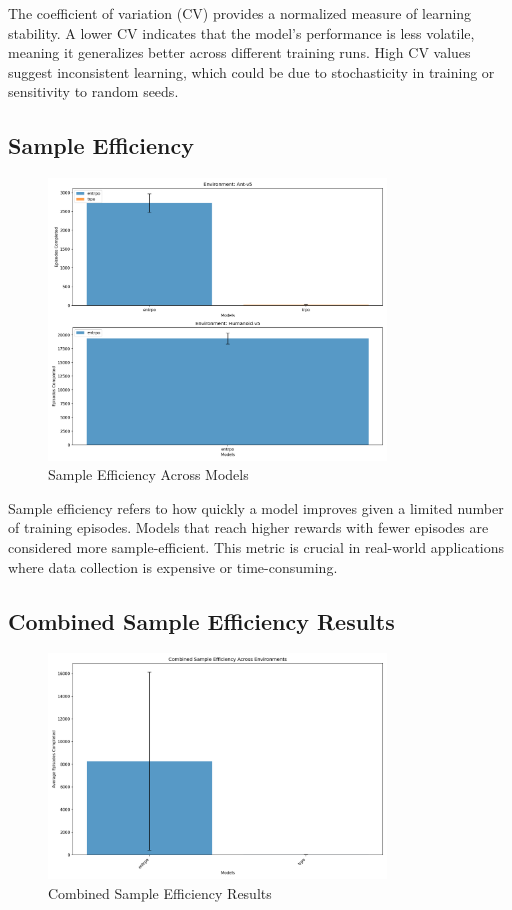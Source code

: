 \documentclass{article}
\begin{document}
The coefficient of variation (CV) provides a normalized measure of learning stability. A lower CV indicates that the model's performance is less volatile, meaning it generalizes better across different training runs. High CV values suggest inconsistent learning, which could be due to stochasticity in training or sensitivity to random seeds.

\subsection*{Sample Efficiency}

\begin{figure}[H]
    \centering
    \includegraphics[width=0.8\textwidth]{.assets/sample_efficiency.png}
    \caption{Sample Efficiency Across Models}
\end{figure}

Sample efficiency refers to how quickly a model improves given a limited number of training episodes. Models that reach higher rewards with fewer episodes are considered more sample-efficient. This metric is crucial in real-world applications where data collection is expensive or time-consuming.

\subsection*{Combined Sample Efficiency Results}

\begin{figure}[H]
    \centering
    \includegraphics[width=0.8\textwidth]{.assets/sample_efficiency_combined.png}
    \caption{Combined Sample Efficiency Results}
\end{figure}
\end{document}
